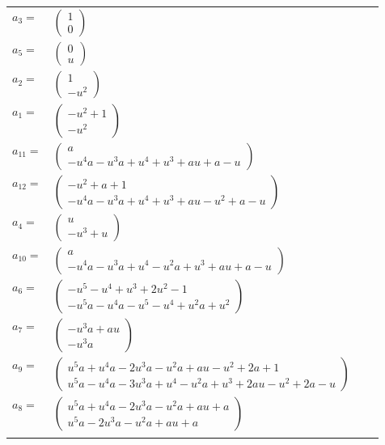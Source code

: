 \documentclass[1p]{elsarticle_modified}
\theoremstyle{definition}
\begin{document}
\begin{tabular}{m{7pt} m{180pt} m{7pt} m{180pt} }
\flushright $a_{3}=$&$\begin{pmatrix}1\\0\end{pmatrix}$ \\
\flushright $a_{5}=$&$\begin{pmatrix}0\\u\end{pmatrix}$ \\
\flushright $a_{2}=$&$\begin{pmatrix}1\\- u^2\end{pmatrix}$ \\
\flushright $a_{1}=$&$\begin{pmatrix}- u^2+1\\- u^2\end{pmatrix}$ \\
\flushright $a_{11}=$&$\begin{pmatrix}a\\- u^4 a- u^3 a+u^4+u^3+a u+a- u\end{pmatrix}$ \\
\flushright $a_{12}=$&$\begin{pmatrix}- u^2+a+1\\- u^4 a- u^3 a+u^4+u^3+a u- u^2+a- u\end{pmatrix}$ \\
\flushright $a_{4}=$&$\begin{pmatrix}u\\- u^3+u\end{pmatrix}$ \\
\flushright $a_{10}=$&$\begin{pmatrix}a\\- u^4 a- u^3 a+u^4- u^2 a+u^3+a u+a- u\end{pmatrix}$ \\
\flushright $a_{6}=$&$\begin{pmatrix}- u^5- u^4+u^3+2 u^2-1\\- u^5 a- u^4 a- u^5- u^4+u^2 a+u^2\end{pmatrix}$ \\
\flushright $a_{7}=$&$\begin{pmatrix}- u^3 a+a u\\- u^3 a\end{pmatrix}$ \\
\flushright $a_{9}=$&$\begin{pmatrix}u^5 a+u^4 a-2 u^3 a- u^2 a+a u- u^2+2 a+1\\u^5 a- u^4 a-3 u^3 a+u^4- u^2 a+u^3+2 a u- u^2+2 a- u\end{pmatrix}$ \\
\flushright $a_{8}=$&$\begin{pmatrix}u^5 a+u^4 a-2 u^3 a- u^2 a+a u+a\\u^5 a-2 u^3 a- u^2 a+a u+a\end{pmatrix}$\\&\end{tabular}
\end{document}
